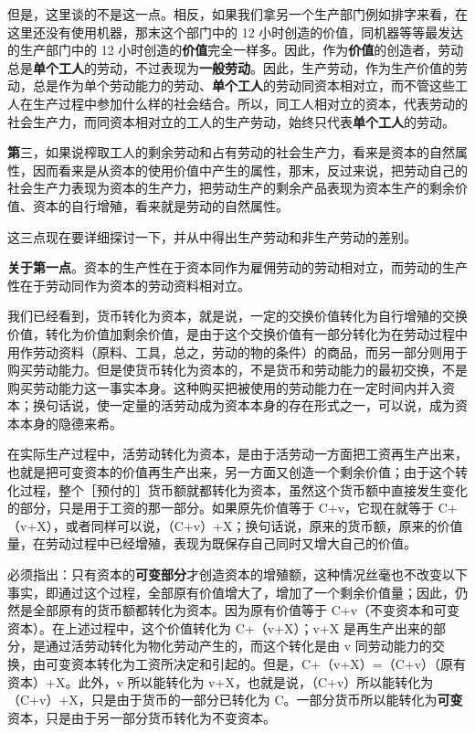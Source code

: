 但是，这里谈的不是这一点。相反，如果我们拿另一个生产部门例如排字来看，在这里还没有使用机器，那末这个部门中的 12 小时创造的价值，同机器等等最发达的生产部门中的 12 小时创造的\textbf{价值}完全一样多。因此，作为\textbf{价值}的创造者，劳动总是\textbf{单个工人}的劳动，不过表现为\textbf{一般劳动}。因此，生产劳动，作为生产价值的劳动，总是作为单个劳动能力的劳动、\textbf{单个工人}的劳动同资本相对立，而不管这些工人在生产过程中参加什么样的社会结合。所以，同工人相对立的资本，代表劳动的社会生产力，而同资本相对立的工人的生产劳动，始终只代表\textbf{单个工人}的劳动。

\textbf{第}三，如果说榨取工人的剩余劳动和占有劳动的社会生产力，看来是资本的自然属性，因而看来是从资本的使用价值中产生的属性，那末，反过来说，把劳动自己的社会生产力表现为资本的生产力，把劳动生产的剩余产品表现为资本生产的剩余价值、资本的自行增殖，看来就是劳动的自然属性。

这三点现在要详细探讨一下，并从中得出生产劳动和非生产劳动的差别。

\textbf{关于第一点}。资本的生产性在于资本同作为雇佣劳动的劳动相对立，而劳动的生产性在于劳动同作为资本的劳动资料相对立。

我们已经看到，货币转化为资本，就是说，一定的交换价值转化为自行增殖的交换价值，转化为价值加剩余价值，是由于这个交换价值有一部分转化为在劳动过程中用作劳动资料（原料、工具，总之，劳动的物的条件）的商品，而另一部分则用于购买劳动能力。但是使货币转化为资本的，不是货币和劳动能力的最初交换，不是购买劳动能力这一事实本身。这种购买把被使用的劳动能力在一定时间内并入资本；换句话说，使一定量的活劳动成为资本本身的存在形式之一，可以说，成为资本本身的隐德来希。

在实际生产过程中，活劳动转化为资本，是由于活劳动一方面把工资再生产出来，也就是把可变资本的价值再生产出来，另一方面又创造一个剩余价值；由于这个转化过程，整个［预付的］货币额就都转化为资本，虽然这个货币额中直接发生变化的部分，只是用于工资的那一部分。如果原先价值等于 C+v，它现在就等于 C+（v+X），或者同样可以说，（C+v）+X；换句话说，原来的货币额，原来的价值量，在劳动过程中已经增殖，表现为既保存自己同时又增大自己的价值。

\fontbox{~\{}必须指出：只有资本的\textbf{可变部分}才创造资本的增殖额，这种情况丝毫也不改变以下事实，即通过这个过程，全部原有价值增大了，增加了一个剩余价值量；因此，仍然是全部原有的货币额都转化为资本。因为原有价值等于 C+v（不变资本和可变资本）。在上述过程中，这个价值转化为 C+（v+X）；v+X 是再生产出来的部分，是通过活劳动转化为物化劳动产生的，而这个转化是由 v 同劳动能力的交换，由可变资本转化为工资所决定和引起的。但是，C+（v+X）=（C+v）（原有资本）+X。此外，v 所以能转化为 v+X，也就是说，（C+v）所以能转化为（C+v）+X，只是由于货币的一部分已转化为 C。一部分货币所以能转化为\textbf{可变}资本，只是由于另一部分货币转化为不变资本。\fontbox{\}~}

